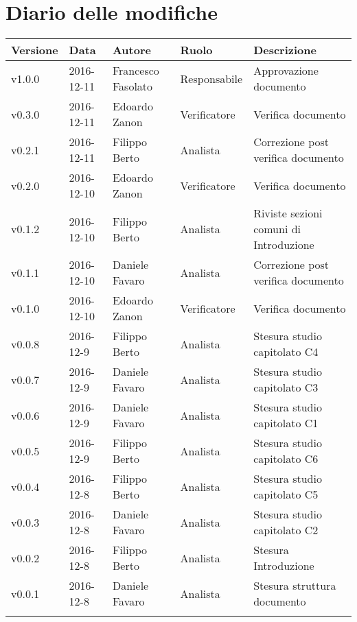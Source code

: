 \section*{Diario delle modifiche}
\begin{longtabu} to \textwidth {
	X[3,c,m] 
	X[4,c,m]
	X[4,c,m]
	X[4,c,m]
	X[10,c,m]}
	\toprule
	\textbf{Versione} & \textbf{Data}  & \textbf{Autore} & \textbf{Ruolo} & \textbf{Descrizione}\\
	\midrule
	\endhead

		v1.0.0 & 2016-12-11 & Francesco Fasolato & Responsabile & Approvazione documento \\ 
		\addlinespace[0.3em]
		\midrule
		\addlinespace[0.3em]
		v0.3.0 & 2016-12-11 & Edoardo Zanon & Verificatore & Verifica documento \\
		\addlinespace[0.3em]
		\midrule
		\addlinespace[0.3em]
		v0.2.1 & 2016-12-11 & Filippo Berto & Analista & Correzione post verifica documento \\
		\addlinespace[0.3em]
		\midrule
		\addlinespace[0.3em]
		v0.2.0 & 2016-12-10 & Edoardo Zanon & Verificatore & Verifica documento \\
		\addlinespace[0.3em]
		\midrule
		\addlinespace[0.3em]
		v0.1.2 & 2016-12-10 & Filippo Berto & Analista & Riviste sezioni comuni di Introduzione \\
		\addlinespace[0.3em]
		\midrule
		\addlinespace[0.3em]
		v0.1.1 & 2016-12-10 & Daniele Favaro & Analista & Correzione post verifica documento \\
		\addlinespace[0.3em]
		\midrule
		\addlinespace[0.3em]
		v0.1.0 & 2016-12-10 & Edoardo Zanon & Verificatore & Verifica documento \\
		\addlinespace[0.3em]
		\midrule
		\addlinespace[0.3em]
		v0.0.8 & 2016-12-9 & Filippo Berto & Analista & Stesura studio capitolato C4 \\
		\addlinespace[0.3em]
		\midrule
		\addlinespace[0.3em]
		v0.0.7 & 2016-12-9 & Daniele Favaro & Analista & Stesura studio capitolato C3 \\
		\addlinespace[0.3em]
		\midrule
		\addlinespace[0.3em]
		v0.0.6 & 2016-12-9 & Daniele Favaro & Analista & Stesura studio capitolato C1 \\
		\addlinespace[0.3em]
		\midrule
		\addlinespace[0.3em]
		v0.0.5 & 2016-12-9 & Filippo Berto & Analista & Stesura studio capitolato C6 \\
		\addlinespace[0.3em]
		\midrule
		\addlinespace[0.3em]
		v0.0.4 & 2016-12-8 & Filippo Berto & Analista & Stesura studio capitolato C5 \\ 
		\addlinespace[0.3em]
		\midrule
		\addlinespace[0.3em]
		v0.0.3 & 2016-12-8 & Daniele Favaro & Analista & Stesura studio capitolato C2 \\ 
		\addlinespace[0.3em]
		\midrule
		\addlinespace[0.3em]
		v0.0.2 & 2016-12-8 & Filippo Berto & Analista & Stesura Introduzione \\ 
		\addlinespace[0.3em]
		\midrule
		\addlinespace[0.3em]
		v0.0.1 & 2016-12-8 & Daniele Favaro & Analista & Stesura struttura documento \\ 

	\bottomrule
\end{longtabu}

